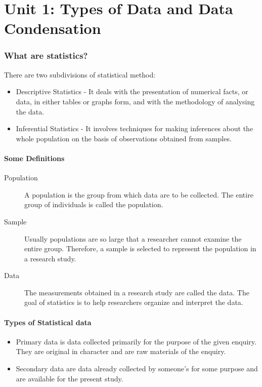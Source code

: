 \documentclass[
10pt, %
a4paper, %
]{report}
\begin{document}


\chapter*{Unit 1: Types of Data and Data Condensation}



\subsection*{What are statistics?}

There are two subdivisions of statistical method:
\begin{itemize}
\item Descriptive Statistics - It deals with the presentation of
numerical facts, or data, in either tables or graphs form,
and with the methodology of analysing the data.
\item Inferential Statistics - It involves techniques for making
inferences about the whole population on the basis of
observations obtained from samples.
\end{itemize}

\subsubsection*{Some Definitions}
\begin{description}
\item[Population] A population is the group from which data are to be collected. The entire group of individuals is called the population.
\item[Sample] Usually populations are so large that a researcher cannot examine the entire group. Therefore, a sample is selected to represent the population in a research study.
\item[Data] The measurements obtained in a research study are called the data. The goal of statistics is to help researchers organize and interpret the data.
\end{description}

\subsubsection*{Types of Statistical data}
\begin{itemize}
\item Primary data is data collected primarily for the purpose of
the given enquiry. They are original in character and are raw
materials of the enquiry.
\item Secondary data are data already collected by someone's for
some purpose and are available for the present study.
\end{itemize}
\end{document}
